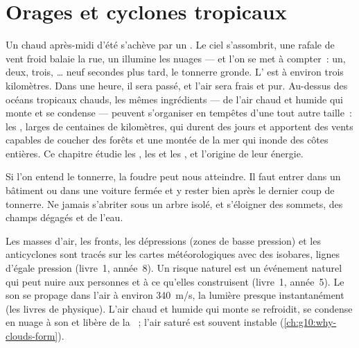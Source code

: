 \chapter{Orages et cyclones tropicaux}\label{ch:g10:storms-and-cyclones}

Un chaud après-midi d'été s'achève par un . Le ciel s'assombrit, une
rafale de vent froid balaie la rue, un  illumine les nuages --- et
l'on se met à compter~: un, deux, trois, \ldots{} neuf secondes plus tard,
le tonnerre gronde. L' est à environ trois kilomètres. Dans une heure,
il sera passé, et l'air sera frais et pur. Au-dessus des océans tropicaux
chauds, les mêmes ingrédients --- de l'air chaud et humide qui monte et se
condense --- peuvent s'organiser en tempêtes d'une tout autre taille~: les
, larges de centaines de kilomètres, qui durent des jours
et apportent des vents capables de coucher des forêts et une montée de la
mer qui inonde des côtes entières. Ce chapitre étudie les , les
 et les , et l'origine de leur énergie.

\begin{safety}
Si l'on entend le tonnerre, la foudre peut nous atteindre. Il faut entrer
dans un bâtiment ou dans une voiture fermée et y rester bien après le
dernier coup de tonnerre. Ne jamais s'abriter sous un arbre isolé, et
s'éloigner des sommets, des champs dégagés et de l'eau.
\end{safety}

\begin{recall}
Les masses d'air, les fronts, les dépressions (zones de basse pression) et
les anticyclones sont tracés sur les cartes météorologiques avec des
isobares, lignes d'égale pression (livre~1, année~8). Un risque naturel est
un événement naturel qui peut nuire aux personnes et à ce qu'elles
construisent (livre~1, année~5). Le son se propage dans l'air à environ
\qty{340}{m/s}, la lumière presque instantanément (les livres de physique).
L'air chaud et humide qui monte se refroidit, se condense en nuage à son
 et libère de la ~; l'air saturé est
souvent instable (\cref{ch:g10:why-clouds-form}).
\end{recall}

